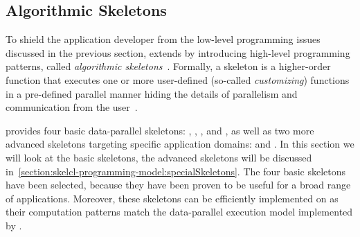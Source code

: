 \subsection{Algorithmic Skeletons}
\label{section:skelcl-programming-model:skeletons}

To shield the application developer from the low-level programming issues discussed in the previous section, \SkelCL extends \OpenCL by introducing high-level programming patterns, called \emph{algorithmic skeletons}~\cite{Cole1991}.
Formally, a skeleton is a higher-order function that executes one or more user-defined (so-called \emph{customizing}) functions in a pre-defined parallel manner hiding the details of parallelism and communication from the user~\cite{GorlatchCo2011}.

\SkelCL provides four basic data-parallel skeletons: \map, \zip, \reduce, and \scan,
as well as two more advanced skeletons targeting specific application domains: \stencil and \allpairs.
In this section we will look at the basic skeletons, the advanced skeletons will be discussed in~\autoref{section:skelcl-programming-model:specialSkeletons}.
The four basic skeletons have been selected, because they have been proven to be useful for a broad range of applications.
Moreover, these skeletons can be efficiently implemented on \GPUs as their computation patterns match the data-parallel execution model implemented by \GPUs.

